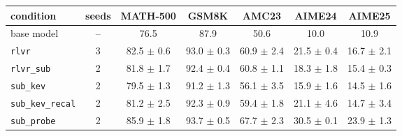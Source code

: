\begin{tabular}{@{}lcccccc@{}}
\toprule
condition & seeds & MATH-500 & GSM8K & AMC23 & AIME24 & AIME25 \\ \midrule
base model & -- & 76.5 & 87.9 & 50.6 & 10.0 & 10.9 \\ \midrule
\texttt{rlvr} & 3 & 82.5 $\pm$ 0.6 & 93.0 $\pm$ 0.3 & 60.9 $\pm$ 2.4 & 21.5 $\pm$ 0.4 & 16.7 $\pm$ 2.1 \\
\texttt{rlvr\_sub} & 2 & 81.8 $\pm$ 1.7 & 92.4 $\pm$ 0.4 & 60.8 $\pm$ 1.1 & 18.3 $\pm$ 1.8 & 15.4 $\pm$ 0.3 \\
\texttt{sub\_kev} & 2 & 79.5 $\pm$ 1.3 & 91.2 $\pm$ 1.3 & 56.1 $\pm$ 3.5 & 15.9 $\pm$ 1.6 & 14.5 $\pm$ 1.6 \\
\texttt{sub\_kev\_recal} & 2 & 81.2 $\pm$ 2.5 & 92.3 $\pm$ 0.9 & 59.4 $\pm$ 1.8 & 21.1 $\pm$ 4.6 & 14.7 $\pm$ 3.4 \\
\texttt{sub\_probe} & 2 & 85.9 $\pm$ 1.8 & 93.7 $\pm$ 0.5 & 67.7 $\pm$ 2.3 & 30.5 $\pm$ 0.1 & 23.9 $\pm$ 1.3 \\
\bottomrule
\end{tabular}
